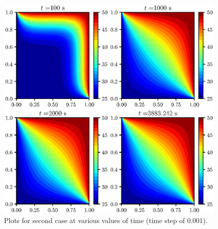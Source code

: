 \documentclass[12pt,a4paper,fleqn]{article}
\begin{document}
\begin{figure}[p!]
\centering
\includegraphics[width=\linewidth]{ht2dCase02.eps}
\caption{Plots for second case at various values of time (time step of 0.001).}
\end{figure}
\end{document}
